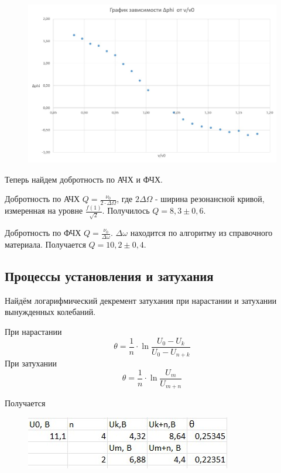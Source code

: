 \documentclass[a4paper,12pt]{article}
\begin{document}
\begin{figure}[H]
	\begin{center}    		
    		\includegraphics[width=1\textwidth]{graphik2.52.jpg}
    	\end{center}
\end{figure}

Теперь найдем добротность по АЧХ и ФЧХ.

Добротность по АЧХ $Q = \frac{\nu_0}{2 \cdot \Delta \Omega}$, где $2\Delta \Omega$ -  ширина резонансной кривой, измеренная на уровне $\frac{f(1)}{\sqrt{2}}$. Получилось $Q = 8,3 \pm 0,6$.

Добротность по ФЧХ $Q = \frac{\nu_0}{\Delta \omega}$. $\Delta \omega$ находится по алгоритму из справочного материала. Получается $Q = 10,2 \pm 0,4$.

\subsection*{Процессы установления и затухания}
Найдём логарифмический декремент затухания при нарастании и затухании вынужденных колебаний.

При нарастании
\[\theta = \frac{1}{n} \cdot \ln{\frac{U_0 - U_k}{U_0 - U_{n+k}}}\]
При затухании
\[\theta = \frac{1}{n} \cdot \ln{\frac{U_m}{U_{m+n}}}\]

\newpage
Получается

\begin{figure}[H]
	\begin{center}
    		\includegraphics[width=.5\textwidth]{tabliza2.6.jpg}
    	\end{center}
\end{figure}
\end{document}
